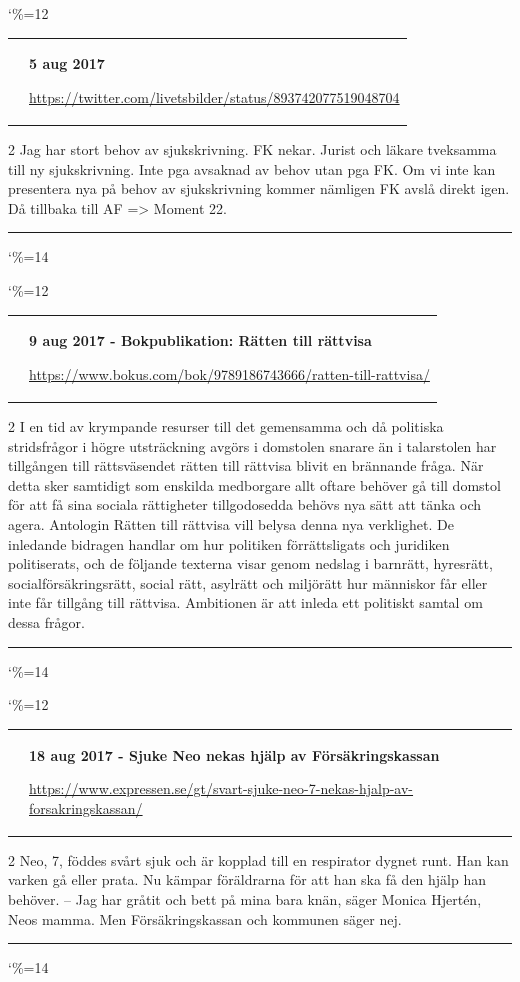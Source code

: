 \documentclass[a4paper]{article}
\makeatletter
\newcommand{\entry}{
\catcode`\%=12
\@entry}
\newcommand{\@entry}[3]{
\bigskip
\begin{tabular*}{\textwidth}{l m{\textwidth-4cm}}
\qrcode{#3} & \textbf{#1}

\medskip

\url{#3}

\end{tabular*}

\medskip


\begin{multicols}{2}
#2
\end{multicols}

\medskip
\hrule

\catcode`\%=14
}
\makeatother
\begin{document}
\entry{5 aug 2017}{Jag har stort behov av sjukskrivning. FK nekar. Jurist och läkare tveksamma till ny sjukskrivning. Inte pga avsaknad av behov utan pga FK. Om vi inte kan presentera nya \say{bevis} på behov av sjukskrivning kommer nämligen FK avslå direkt igen. Då tillbaka till AF => Moment 22.}{https://twitter.com/livetsbilder/status/893742077519048704}


\entry{9 aug 2017 - Bokpublikation: Rätten till rättvisa}{I en tid av krympande resurser till det gemensamma och då politiska stridsfrågor i högre utsträckning avgörs i domstolen snarare än i talarstolen har tillgången till rättsväsendet rätten till rättvisa blivit en brännande fråga. När detta sker samtidigt som enskilda medborgare allt oftare behöver gå till domstol för att få sina sociala rättigheter tillgodosedda behövs nya sätt att tänka och agera.
Antologin Rätten till rättvisa vill belysa denna nya verklighet. De inledande bidragen handlar om hur politiken förrättsligats och juridiken politiserats, och de följande texterna visar genom nedslag i barnrätt, hyresrätt, socialförsäkringsrätt, social rätt, asylrätt och miljörätt hur människor får eller inte får tillgång till rättvisa. Ambitionen är att inleda ett politiskt samtal om dessa frågor.}{https://www.bokus.com/bok/9789186743666/ratten-till-rattvisa/}

\entry{18 aug 2017 - Sjuke Neo nekas hjälp av Försäkringskassan}{Neo, 7, föddes svårt sjuk och är kopplad till en respirator dygnet runt. Han kan varken gå eller prata.
Nu kämpar föräldrarna för att han ska få den hjälp han behöver.
– Jag har gråtit och bett på mina bara knän, säger Monica Hjertén, Neos mamma.
Men Försäkringskassan och kommunen säger nej.}{https://www.expressen.se/gt/svart-sjuke-neo-7-nekas-hjalp-av-forsakringskassan/}
\end{document}
